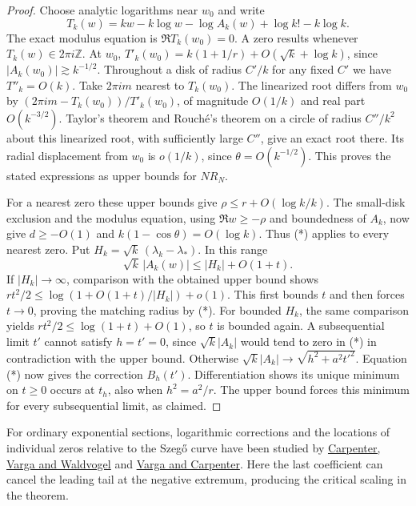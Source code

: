 \begin{proof}
Choose analytic logarithms near \(w_0\) and write
\[
 T_k(w)=kw-k\log w-\log A_k(w)+\log k!-k\log k.
\]
The exact modulus equation is \(\Re T_k(w_0)=0\). A zero results whenever \(T_k(w)\in2\pi i\mathbb Z\). At \(w_0\), \(T'_k(w_0)=k(1+1/r)+O(\sqrt k+\log k)\), since \(|A_k(w_0)|\gtrsim k^{-1/2}\). Throughout a disk of radius \(C'/k\) for any fixed \(C'\) we have \(T''_k=O(k)\). Take \(2\pi i m\) nearest to \(T_k(w_0)\). The linearized root differs from \(w_0\) by \((2\pi i m-T_k(w_0))/T'_k(w_0)\), of magnitude \(O(1/k)\) and real part \(O(k^{-3/2})\). Taylor's theorem and Rouch\'e's theorem on a circle of radius \(C''/k^2\) about this linearized root, with sufficiently large \(C''\), give an exact root there. Its radial displacement from \(w_0\) is \(o(1/k)\), since \(\theta=O(k^{-1/2})\). This proves the stated expressions as upper bounds for \(NR_N\).

For a nearest zero these upper bounds give \(\rho\le r+O(\log k/k)\). The small-disk exclusion and the modulus equation, using \(\Re w\ge-\rho\) and boundedness of \(A_k\), now give \(d\ge-O(1)\) and \(k(1-\cos\theta)=O(\log k)\). Thus (*) applies to every nearest zero. Put \(H_k=\sqrt k\,(\lambda_k-\lambda_*)\). In this range
\[
 \sqrt k\,|A_k(w)|\le |H_k|+O(1+t).
\]
If \(|H_k|\to\infty\), comparison with the obtained upper bound shows \(rt^2/2\le\log(1+O(1+t)/|H_k|)+o(1)\). This first bounds \(t\) and then forces \(t\to0\), proving the matching radius by (*). For bounded \(H_k\), the same comparison yields \(rt^2/2\le\log(1+t)+O(1)\), so \(t\) is bounded again. A subsequential limit \(t'\) cannot satisfy \(h=t'=0\), since \(\sqrt k|A_k|\) would tend to zero in (*) in contradiction with the upper bound. Otherwise \(\sqrt k|A_k|\to\sqrt{h^2+a^2t'^2}\). Equation (*) now gives the correction \(B_h(t')\). Differentiation shows its unique minimum on \(t\ge0\) occurs at \(t_h\), also when \(h^2=a^2/r\). The upper bound forces this minimum for every subsequential limit, as claimed.
\end{proof}

For ordinary exponential sections, logarithmic corrections and the locations of individual zeros relative to the Szeg\H{o} curve have been studied by \href{https://doi.org/10.1216/rmjm/1181072998}{Carpenter, Varga and Waldvogel} and \href{https://www.math.kent.edu/~varga/pub/paper_178.pdf}{Varga and Carpenter}. Here the last coefficient can cancel the leading tail at the negative extremum, producing the critical scaling in the theorem.
